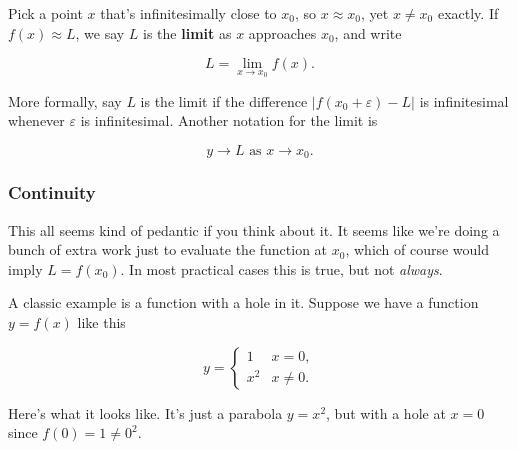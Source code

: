 \documentclass[
  letterpaper,
  DIV=11,
  numbers=noendperiod]{scrreprt}
\begin{document}
Pick a point \(x\) that's infinitesimally close to \(x_0\), so
\(x \approx x_0\), yet \(x \neq x_0\) exactly. If \(f(x) \approx L\), we
say \(L\) is the \textbf{limit} as \(x\) approaches \(x_0\), and write

\[L = \lim_{x \rightarrow x_0} f(x).\]

More formally, say \(L\) is the limit if the difference
\(|f(x_0+\varepsilon)-L|\) is infinitesimal whenever \(\varepsilon\) is
infinitesimal. Another notation for the limit is

\[y \rightarrow L \text{ as } x \rightarrow x_0.\]

\hypertarget{continuity}{%
\subsubsection{Continuity}\label{continuity}}

This all seems kind of pedantic if you think about it. It seems like
we're doing a bunch of extra work just to evaluate the function at
\(x_0\), which of course would imply \(L=f(x_0)\). In most practical
cases this is true, but not \emph{always}.

A classic example is a function with a hole in it. Suppose we have a
function \(y=f(x)\) like this

\[
y = 
\begin{cases}
1 & x = 0, \\
x^2 & x \neq 0.
\end{cases}
\]

Here's what it looks like. It's just a parabola \(y=x^2\), but with a
hole at \(x=0\) since \(f(0)=1\neq 0^2\).
\end{document}
